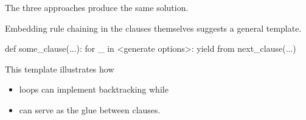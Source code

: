 \noindent The three approaches produce the same solution.
\smallv
\smallv
\smallv

Embedding rule chaining in the clauses themselves suggests a general template.

\begin{python}
      def some_clause(...):
        for _ in <generate options>:
          yield from next_clause(...)
\end{python}

This template illustrates how
\begin{itemize}[label=$\bullet$]
\item{} loops can implement backtracking while  \item{}  can serve as the glue between clauses. 
\end{itemize}
